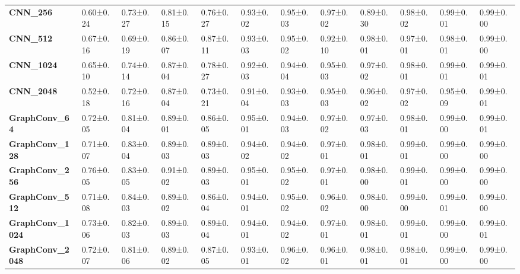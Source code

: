 \begin{tabular}{llllllllllll}
\textbf{CNN\_256       } &         0.60±0.24 &        0.73±0.27 &        0.81±0.15 &       0.76±0.27 &        0.93±0.02 &       0.95±0.03 &        0.97±0.02 &       0.89±0.30 &       0.98±0.02 &        0.99±0.01 &        0.99±0.00 \\
\textbf{CNN\_512       } &         0.67±0.16 &        0.69±0.19 &        0.86±0.07 &       0.87±0.11 &        0.93±0.03 &       0.95±0.02 &        0.92±0.10 &       0.98±0.01 &       0.97±0.01 &        0.98±0.01 &        0.99±0.00 \\
\textbf{CNN\_1024      } &         0.65±0.10 &        0.74±0.14 &        0.87±0.04 &       0.78±0.27 &        0.92±0.03 &       0.94±0.04 &        0.95±0.03 &       0.97±0.02 &       0.98±0.01 &        0.99±0.01 &        0.99±0.01 \\
\textbf{CNN\_2048      } &         0.52±0.18 &        0.72±0.16 &        0.87±0.04 &       0.73±0.21 &        0.91±0.04 &       0.93±0.03 &        0.95±0.03 &       0.96±0.02 &       0.97±0.02 &        0.95±0.09 &        0.99±0.01 \\
\textbf{GraphConv\_64  } &         0.72±0.05 &        0.81±0.04 &        0.89±0.01 &       0.86±0.05 &        0.95±0.01 &       0.94±0.03 &        0.97±0.02 &       0.97±0.03 &       0.98±0.01 &        0.99±0.00 &        0.99±0.01 \\
\textbf{GraphConv\_128 } &         0.71±0.07 &        0.83±0.04 &        0.89±0.03 &       0.89±0.03 &        0.94±0.02 &       0.94±0.02 &        0.97±0.01 &       0.98±0.01 &       0.99±0.01 &        0.99±0.00 &        0.99±0.00 \\
\textbf{GraphConv\_256 } &         0.76±0.05 &        0.83±0.05 &        0.91±0.02 &       0.89±0.03 &        0.95±0.01 &       0.95±0.02 &        0.97±0.01 &       0.98±0.00 &       0.99±0.01 &        0.99±0.00 &        0.99±0.00 \\
\textbf{GraphConv\_512 } &         0.71±0.08 &        0.84±0.03 &        0.89±0.02 &       0.86±0.04 &        0.94±0.01 &       0.95±0.02 &        0.96±0.02 &       0.98±0.00 &       0.99±0.00 &        0.99±0.01 &        0.99±0.00 \\
\textbf{GraphConv\_1024} &         0.73±0.06 &        0.82±0.03 &        0.89±0.03 &       0.89±0.04 &        0.94±0.01 &       0.94±0.02 &        0.97±0.01 &       0.98±0.01 &       0.99±0.01 &        0.99±0.00 &        0.99±0.01 \\
\textbf{GraphConv\_2048} &         0.72±0.07 &        0.81±0.06 &        0.89±0.02 &       0.87±0.05 &        0.93±0.01 &       0.96±0.02 &        0.96±0.01 &       0.98±0.01 &       0.98±0.01 &        0.99±0.00 &        0.99±0.00 \\
\bottomrule
\end{tabular}
